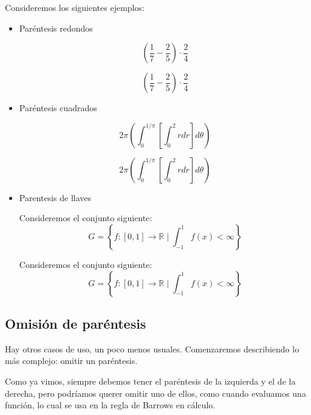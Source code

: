 \documentclass[graybox,envcountchap,sectrefs]{svmono}
\begin{document}
            Consideremos los siguientes ejemplos:
            \begin{itemize}
                \item Paréntesis redondos
            \begin{code}
            \[ \left( \frac{1}{7} - \frac{2}{5}\right)\cdot \frac{2}{4} \]
            \end{code}

            \begin{compiled}
            \[ \left( \frac{1}{7} - \frac{2}{5}\right)\cdot \frac{2}{4} \]
            \end{compiled}
            
        \item Paréntesis cuadrados
            \begin{code}
                \[ 2\pi\left( \int_0^{1/\pi}
                \left[ \int_0^2 rdr\right]d\theta\right) \]
            \end{code}

            \begin{compiled}
                \[ 2\pi\left( \int_0^{1/\pi} \left[ \int_0^2 rdr\right]d\theta\right) \]
            \end{compiled}

        \item Parentesis de llaves
            \begin{code}
                Consideremos el conjunto siguiente:
                    \[G = \left\lbrace f:[0,1]\to\mathbb{R} \mid
                    \int_{-1}^1 f(x) < \infty \right\rbrace\]
            \end{code}

            \begin{compiled}
                Consideremos el conjunto siguiente:
                    \[G = \left\lbrace f:[0,1]\to\mathbb{R} \mid \int_{-1}^1 f(x) < \infty \right\rbrace\]
            \end{compiled}
        \end{itemize}


            \subsection{Omisión de paréntesis}
            Hay otros casos de uso, un poco menos usuales. 
            Comenzaremos describiendo lo más complejo: omitir un paréntesis.


            Como ya vimos, siempre debemos tener el paréntesis de la izquierda y el de la derecha, pero podríamos
            querer omitir uno de ellos, como cuando evaluamos una función, lo cual se usa en la regla de Barrows en cálculo.
\end{document}
